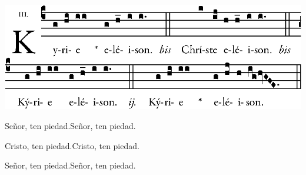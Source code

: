 \begin{center}
\includegraphics[width=.9\textwidth]{src/ordinario/kyrie.eps}
\end{center}

\pr Señor, ten piedad.\redast\be Señor, ten piedad.

\pr Cristo, ten piedad.\redast\be Cristo, ten piedad.

\pr Señor, ten piedad.\redast\be Señor, ten piedad.